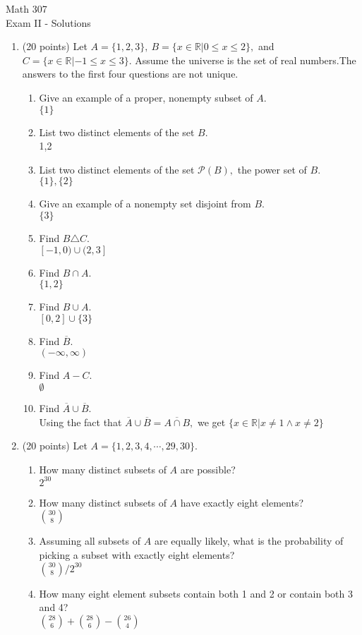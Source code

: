 \documentclass{amsart}
\newcommand{\real}{\mathbb{R}}
\begin{document}
\Large{
\begin{center}Math 307\\
Exam II - Solutions\\
\begin{enumerate}
\item (20 points) Let $A=\{1,2,3\}, \: B=\{x \in \real | 0 \leq x \leq 2 \},$ and
$C= \{x \in \real | -1 \leq x \leq 3\}.$ Assume the universe is the
set of real numbers.The answers to the first four questions are not
unique.
\begin{enumerate}
\item Give an example of a proper, nonempty subset of $A.$ \\ $\{1\}$
\item List two distinct elements of the set $B.$ \\ 1,2
\item List two distinct elements of the set $\mathcal{P}(B),$ the
power set of $B.$ \\ $\{1\},\{2\}$
\item Give an example of a nonempty set disjoint from $B.$ \\
$\{3\}$
\item Find $B \triangle C.$ \\ $[-1,0) \cup (2, 3]$
\item Find $B \cap A.$ \\ $\{1,2\}$
\item Find $B \cup A.$ \\ $[0,2] \cup \{3\}$
\item Find $\overline{B}.$ \\ $(- \infty, \infty )$
\item Find $A - C.$ \\ $ \emptyset $
\item Find $\overline{A} \cup \overline{B}.$\\ Using the fact that $\overline{A} \cup \overline{B}
= \overline{ A \cap B},$ we get $\{ x \in \real | x \not = 1 \wedge
x \not = 2 \}$
\end{enumerate}
\item (20 points) Let $A=\{1,2,3,4, \cdots, 29,30\}.$ \begin{enumerate}
\item How many distinct subsets of $A$ are possible? \\ $2^{30}$
\item How many distinct subsets of $A$ have exactly eight elements?
\\ $ 30 \choose 8$
\item Assuming all subsets of $A$ are equally likely, what is the
probability of picking a subset with exactly eight elements?
\\ ${30 \choose 8}/ 2^{30}$
\item How many eight element subsets contain both 1 and 2 or contain
both 3 and 4? \\ ${28 \choose 6}+{28 \choose 6} - {26 \choose 4}$
\end{enumerate}


\end{enumerate}
\end{center}}
\end{document}
